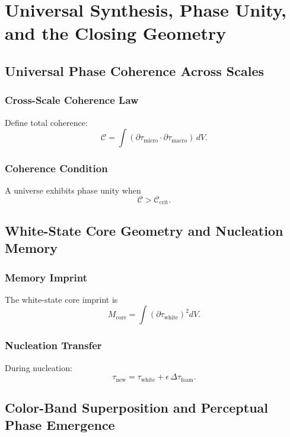 

\part{Universal Synthesis, Phase Unity, and the Closing Geometry}

\chapter{Universal Phase Coherence Across Scales}

\section{Cross-Scale Coherence Law}
Define total coherence:
\[
\mathcal{C} = \int (\partial\tau_{\mathrm{micro}} \cdot \partial\tau_{\mathrm{macro}})\, dV.
\]

\section{Coherence Condition}
A universe exhibits phase unity when
\[
\mathcal{C} > \mathcal{C}_{\mathrm{crit}}.
\]

\chapter{White-State Core Geometry and Nucleation Memory}

\section{Memory Imprint}
The white-state core imprint is
\[
M_{\mathrm{core}} = \int (\partial\tau_{\mathrm{white}})^2 dV.
\]

\section{Nucleation Transfer}
During nucleation:
\[
\tau_{\mathrm{new}} = \tau_{\mathrm{white}} + \epsilon\,\Delta\tau_{\mathrm{foam}}.
\]

\chapter{Color-Band Superposition and Perceptual Phase Emergence}

